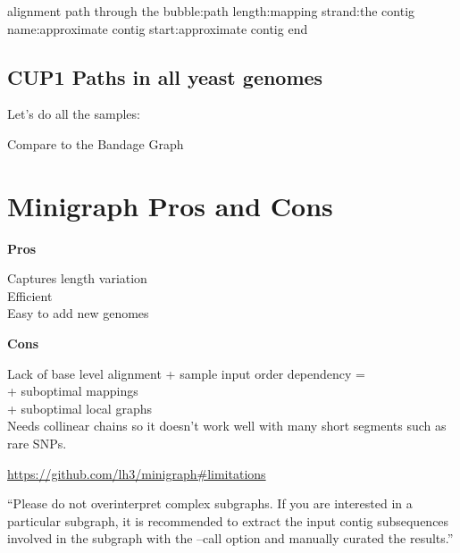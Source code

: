 \documentclass[
]{book}
\newenvironment{Shaded}{\begin{snugshade}}{\end{snugshade}}
\newcommand{\AttributeTok}[1]{\textcolor[rgb]{0.77,0.63,0.00}{#1}}
\newcommand{\ControlFlowTok}[1]{\textcolor[rgb]{0.13,0.29,0.53}{\textbf{#1}}}
\newcommand{\ExtensionTok}[1]{#1}
\newcommand{\FunctionTok}[1]{\textcolor[rgb]{0.00,0.00,0.00}{#1}}
\newcommand{\KeywordTok}[1]{\textcolor[rgb]{0.13,0.29,0.53}{\textbf{#1}}}
\newcommand{\NormalTok}[1]{#1}
\newcommand{\OperatorTok}[1]{\textcolor[rgb]{0.81,0.36,0.00}{\textbf{#1}}}
\newcommand{\PreprocessorTok}[1]{\textcolor[rgb]{0.56,0.35,0.01}{\textit{#1}}}
\newcommand{\VariableTok}[1]{\textcolor[rgb]{0.00,0.00,0.00}{#1}}
\begin{document}
alignment path through the bubble:path length:mapping strand:the contig name:approximate contig start:approximate contig end

\hypertarget{cup1-paths-in-all-yeast-genomes}{%
\subsection*{CUP1 Paths in all yeast genomes}\label{cup1-paths-in-all-yeast-genomes}}

Let's do all the samples:

\begin{Shaded}
\end{Shaded}

Compare to the Bandage Graph

\hypertarget{minigraph-pros-and-cons}{%
\section{Minigraph Pros and Cons}\label{minigraph-pros-and-cons}}

\textbf{Pros}

Captures length variation\\
Efficient\\
Easy to add new genomes

\textbf{Cons}

Lack of base level alignment + sample input order dependency =\\
+ suboptimal mappings\\
+ suboptimal local graphs\\
Needs collinear chains so it doesn't work well with many short segments such as rare SNPs.

\url{https://github.com/lh3/minigraph\#limitations}

``Please do not overinterpret complex subgraphs. If you are interested in a particular subgraph, it is recommended to extract the input contig subsequences involved in the subgraph with the --call option and manually curated the results.''
\end{document}
